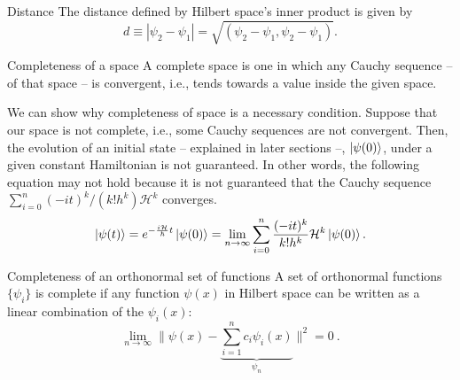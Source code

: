 \begin{definition}{Distance}{}
    The distance defined by Hilbert space's inner product is given by
    \begin{equation}
      d \equiv \left|\psi_{2} - \psi_{1}\right| = \sqrt{(\psi_{2}-\psi_{1},\psi_{2}-\psi_{1})}.  
    \end{equation}
\end{definition}
\begin{definition}{Completeness of a space}{}
A complete space is one in which any Cauchy sequence -- of that space -- is convergent, i.e., tends towards a value inside the given space.
\end{definition}
We can show why completeness of space is a necessary condition. Suppose that our space is not complete, i.e., some Cauchy sequences are not convergent. Then, the evolution of an initial state -- explained in later sections --, $\ket{\psi(0)}$, under a given constant Hamiltonian is not guaranteed. In other words, the following equation may not hold because it is not guaranteed that the Cauchy sequence $\sum_{i = 0}^{n}(-it)^{k} / \left(k!h^{k}\right)\mathcal{H}^{k}$ converges.
\begin{equation}
    \ket{\psi(t)} = e^{-\frac{i\mathcal{H}}{\hbar}t}\ket{\psi(0)} = \lim_{n \to \infty} \sum_{i = 0}^{n}\frac{(-it)^{k}}{k!h^{k}}\mathcal{H}^{k}\ket{\psi(0)}.
\end{equation}
\begin{definition}{Completeness of an orthonormal set of functions}{}
A set of orthonormal functions $\{\psi_{i}\}$ is complete if any function $\psi(x)$ in Hilbert space can be written as a linear combination of the $\psi_{i}(x)$:
\begin{equation}
    \lim_{n\to \infty}\| \psi(x) - \underbrace{\sum_{i=1}^{n}c_{i}\psi_{i}(x)}_{\psi_{n}}\|^{2}= 0\ .
\end{equation}
\end{definition}
